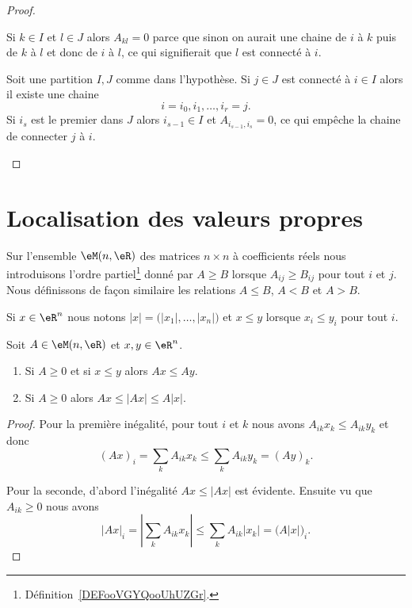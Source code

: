 \begin{proof}
\begin{subproof}
		Si \( k\in I\) et \( l\in J\) alors \( A_{kl}=0\) parce que sinon on aurait une chaine de \( i\) à \( k\) puis de \( k\) à \( l\) et donc de \( i\) à \( l\), ce qui signifierait que \( l\) est connecté à \( i\).

		Soit une partition \( I,J\) comme dans l'hypothèse. Si \( j\in J\) est connecté à \( i\in I\) alors il existe une chaine
		\begin{equation}
			i=i_0,i_1,\ldots, i_r=j.
		\end{equation}
		Si \( i_s\) est le premier dans \( J\) alors \( i_{s-1}\in I\) et \( A_{i_{s-1},i_s}=0\), ce qui empêche la chaine de connecter \( j\) à \( i\).
	\end{subproof}
\end{proof}

\section{Localisation des valeurs propres}

Sur l'ensemble \( \eM(n,\eR)\) des matrices \( n\times n\) à coefficients réels nous introduisons l'ordre partiel\footnote{Définition~\ref{DEFooVGYQooUhUZGr}.} donné par \( A\geq B\) lorsque \( A_{ij}\geq B_{ij}\) pour tout \( i\) et \( j\). Nous définissons de façon similaire les relations \( A\leq B\), \( A<B\) et \( A>B\).

Si \( x\in \eR^n\) nous notons \( | x |=\big( | x_1 |,\ldots, | x_n | \big)\) et \( x\leq y\) lorsque \( x_i\leq y_i\) pour tout \( i\).

\begin{proposition}     \label{PROPooGVRVooZEvKcn}
	Soit \( A\in \eM(n,\eR)\) et \( x,y\in \eR^n\).
	\begin{enumerate}
		\item       \label{ITEMooXQOPooPVLjFh}
		      Si \( A\geq 0\) et si \( x\leq y\) alors \( Ax\leq Ay\).
		\item       \label{ITEMooQLCJooKIbws}
		      Si \( A\geq 0\) alors \( Ax\leq | Ax |\leq A| x |\).
	\end{enumerate}
\end{proposition}

\begin{proof}
	Pour la première inégalité, pour tout \( i\) et \( k\) nous avons \( A_{ik}x_k\leq A_{ik}y_k\) et donc
	\begin{equation}
		(Ax)_i=\sum_kA_{ik}x_k\leq \sum_kA_{ik}y_k=(Ay)_k.
	\end{equation}

	Pour la seconde, d'abord l'inégalité \( Ax\leq | Ax |\) est évidente. Ensuite vu que \( A_{ik}\geq 0\) nous avons
	\begin{equation}
		| Ax |_i=| \sum_kA_{ik}x_k |\leq \sum_kA_{ik}| x_k |=\big( A| x | \big)_i.
	\end{equation}
\end{proof}

